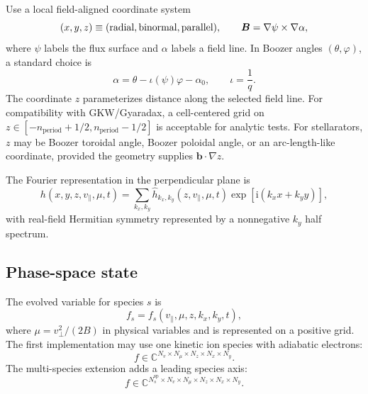 \documentclass[11pt,a4paper]{article}
\newcommand{\ii}{\mathrm{i}}
\newcommand{\vpar}{v_{\parallel}}
\newcommand{\bvec}{\bm b}
\newcommand{\Bvec}{\bm B}
\newcommand{\grad}{\nabla}
\begin{document}
Use a local field-aligned coordinate system
\begin{equation}
  (x,y,z) \equiv (\hbox{radial},\hbox{binormal},\hbox{parallel}),
  \qquad
  \Bvec = \grad \psi \times \grad \alpha,
  \label{eq:clebsch}
\end{equation}
where \(\psi\) labels the flux surface and \(\alpha\) labels a field line.  In Boozer angles \((\theta,\varphi)\), a standard choice is
\begin{equation}
  \alpha = \theta - \iota(\psi)\varphi - \alpha_0,
  \qquad
  \iota = \frac{1}{q}.
  \label{eq:alpha-boozer}
\end{equation}
The coordinate \(z\) parameterizes distance along the selected field line.  For compatibility with GKW/Gyaradax, a cell-centered grid on \(z\in[-n_{\mathrm{period}}+1/2,n_{\mathrm{period}}-1/2]\) is acceptable for analytic tests.  For stellarators, \(z\) may be Boozer toroidal angle, Boozer poloidal angle, or an arc-length-like coordinate, provided the geometry supplies \(\bvec\cdot\grad z\).

The Fourier representation in the perpendicular plane is
\begin{equation}
  h(x,y,z,\vpar,\mu,t)
  =
  \sum_{k_x,k_y} \hat h_{k_x,k_y}(z,\vpar,\mu,t)
  \exp\!\left[\ii(k_x x+k_y y)\right],
  \label{eq:fourier}
\end{equation}
with real-field Hermitian symmetry represented by a nonnegative \(k_y\) half spectrum.

\subsection{Phase-space state}

The evolved variable for species \(s\) is
\begin{equation}
  f_s = f_s(\vpar,\mu,z,k_x,k_y,t),
  \label{eq:state}
\end{equation}
where \(\mu = v_\perp^2/(2B)\) in physical variables and is represented on a positive grid.  The first implementation may use one kinetic ion species with adiabatic electrons:
\begin{equation}
  f \in \mathbb{C}^{N_{v}\times N_{\mu}\times N_z\times N_x\times N_y}.
\end{equation}
The multi-species extension adds a leading species axis:
\begin{equation}
  f \in \mathbb{C}^{N_s^{\mathrm{sp}}\times N_{v}\times N_{\mu}\times N_z\times N_x\times N_y}.
\end{equation}
\end{document}
